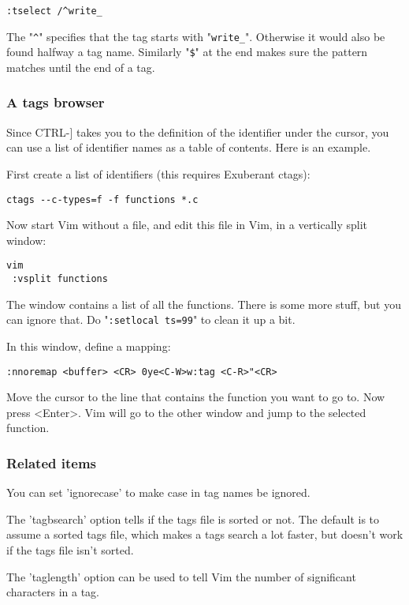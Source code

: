 \begin{Verbatim}[samepage=true]
 :tselect /^write_
\end{Verbatim}

The "\verb!^!" specifies that the tag starts with "\verb!write_!".
Otherwise it would also be found halfway a tag name.
Similarly "\verb!$!" at the end makes sure the pattern matches until the end of a tag.
\subsubsection{A tags browser}
Since CTRL-] takes you to the definition of the identifier under the cursor, you can use a list of identifier names as a table of contents.
Here is an example.

First create a list of identifiers (this requires Exuberant ctags):

\begin{Verbatim}[samepage=true]
 ctags --c-types=f -f functions *.c
\end{Verbatim}

Now start Vim without a file, and edit this file in Vim, in a vertically split window:

\begin{Verbatim}[samepage=true]
 vim
 :vsplit functions
\end{Verbatim}

The window contains a list of all the functions.
There is some more stuff, but you can ignore that.
Do "\verb!:setlocal ts=99!" to clean it up a bit.

In this window, define a mapping:

\begin{Verbatim}[samepage=true]
 :nnoremap <buffer> <CR> 0ye<C-W>w:tag <C-R>"<CR>
\end{Verbatim}

Move the cursor to the line that contains the function you want to go to.
Now press <Enter>.
Vim will go to the other window and jump to the selected function.
\subsubsection{Related items}
You can set 'ignorecase' to make case in tag names be ignored.

The 'tagbsearch' option tells if the tags file is sorted or not.
The default is to assume a sorted tags file, which makes a tags search a lot faster, but doesn't work if the tags file isn't sorted.

The 'taglength' option can be used to tell Vim the number of significant characters in a tag.

